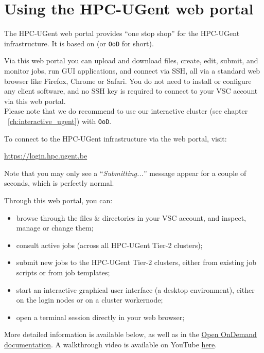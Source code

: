\chapter{Using the HPC-UGent web portal}
\label{ch:web_portal}

The HPC-UGent web portal provides ``one stop shop'' for the HPC-UGent infrastructure.
It is based on \href{https://openondemand.org/}{} (or \texttt{OoD} for short).

Via this web portal you can upload and download files, create, edit, submit, and monitor jobs,
run GUI applications, and connect via SSH, all via a standard web browser like Firefox, Chrome
or Safari. You do not need to install or configure any client software,
and no SSH key is required to connect to your VSC account via this web portal.
 \\
Please note that we do recommend to use our interactive cluster
(see chapter ~\ref{ch:interactive_ugent}) with \texttt{OoD}.

To connect to the HPC-UGent infrastructure via the web portal, visit:

\begin{center}\url{https://login.hpc.ugent.be}\end{center}

Note that you may only see a ``\emph{Submitting...}'' message appear for a couple of seconds,
which is perfectly normal.

Through this web portal, you can:
\begin{itemize}
    \item browse through the files \& directories in your VSC account, and inspect, manage or change them;
    \item consult active jobs (across all HPC-UGent Tier-2 clusters);
    \item submit new jobs to the HPC-UGent Tier-2 clusters, either from existing job scripts or from job templates;
    \item start an interactive graphical user interface (a desktop environment), either on the login nodes or on a cluster workernode;
    \item open a terminal session directly in your web browser;
\end{itemize}

More detailed information is available below, as well as in the \href{https://osc.github.io/ood-documentation/master/}{Open OnDemand documentation}.
A walkthrough video is available on YouTube \href{https://www.youtube.com/watch?v=4-w-4wjlnPk}{here}.

